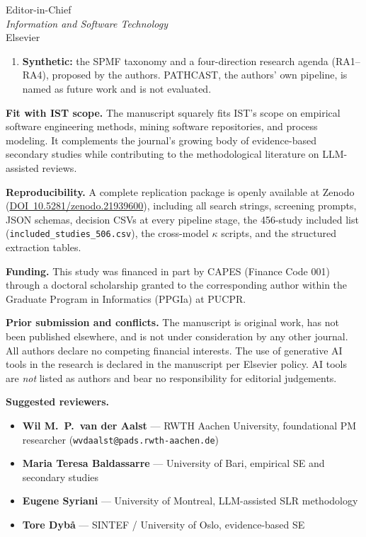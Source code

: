 \documentclass[11pt,a4paper]{letter}
\newcommand{\zenododoi}{10.5281/zenodo.21939600}
\newcommand{\zenododoiurl}{https://doi.org/\zenododoi}
\begin{document}
\begin{letter}{Editor-in-Chief \\ \emph{Information and Software Technology} \\ Elsevier}
\begin{enumerate}
      working-set studies inside the 306, and the 293-study joint cut).
      One study in the 380 with at least one family mark (PRIMAD) matches
      process mining, a stochastic model, and forecasting; every study
      coded with two technique families ($n = 99$) was re-examined for the
      third, and none reaches L3. Two free-text
      fields (F2, F5) are withdrawn after a 0\% exact match with a human
      rater on 31 studies; a single scope paragraph states what the
      counts describe.
\item \textbf{Synthetic:} the SPMF taxonomy and a four-direction research
      agenda (RA1--RA4), proposed by the authors. PATHCAST, the authors'
      own pipeline, is named as future work and is not evaluated.
\end{enumerate}

\medskip\noindent\textbf{Fit with IST scope.}
The manuscript squarely fits IST's scope on empirical software engineering
methods, mining software repositories, and process modeling. It complements
the journal's growing body of evidence-based secondary studies while
contributing to the methodological literature on LLM-assisted reviews.

\medskip\noindent\textbf{Reproducibility.}
A complete replication package is openly available at Zenodo
(\href{\zenododoiurl}{DOI~\zenododoi}),
including all search strings, screening prompts, JSON schemas, decision
CSVs at every pipeline stage, the 456-study included list
(\texttt{included\_studies\_506.csv}), the cross-model $\kappa$ scripts,
and the structured extraction tables.

\medskip\noindent\textbf{Funding.}
This study was financed in part by CAPES (Finance Code 001) through a
doctoral scholarship granted to the corresponding author within the
Graduate Program in Informatics (PPGIa) at PUCPR.

\medskip\noindent\textbf{Prior submission and conflicts.}
The manuscript is original work, has not been published elsewhere, and is
not under consideration by any other journal. All authors declare no
competing financial interests. The use of generative AI tools in the
research is declared in the manuscript per Elsevier policy. AI tools are
\emph{not} listed as authors and bear no responsibility for editorial
judgements.

\medskip\noindent\textbf{Suggested reviewers.}
\begin{itemize}
\item \textbf{Wil M.\ P.\ van der Aalst} --- RWTH Aachen University,
      foundational PM researcher (\texttt{wvdaalst@pads.rwth-aachen.de})
\item \textbf{Maria Teresa Baldassarre} --- University of Bari, empirical
      SE and secondary studies
\item \textbf{Eugene Syriani} --- University of Montreal, LLM-assisted SLR
      methodology
\item \textbf{Tore Dyb{\aa}} --- SINTEF / University of Oslo, evidence-based
      SE
\end{itemize}


\end{letter}
\end{document}

